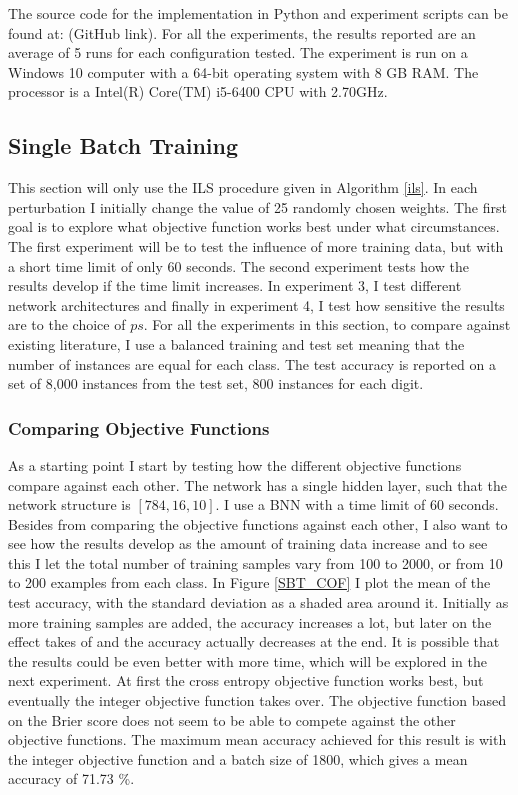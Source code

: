 \noindent The source code for the implementation in Python and experiment scripts can be found at: (GitHub link). For all the experiments, the results reported are an average of 5 runs for each configuration tested. The experiment is run on a Windows 10 computer with a 64-bit operating system with 8 GB RAM. The processor is a Intel(R) Core(TM) i5-6400 CPU with 2.70GHz. 


\subsection{Single Batch Training}

This section will only use the ILS procedure given in Algorithm \ref{ils}. In each perturbation I initially change the value of 25 randomly chosen weights. The first goal is to explore what objective function works best under what circumstances. The first experiment will be to test the influence of more training data, but with a short time limit of only 60 seconds. The second experiment tests how the results develop if the time limit increases. In experiment 3, I test different network architectures and finally in experiment 4, I test how sensitive the results are to the choice of $ps$. For all the experiments in this section, to compare against existing literature, I use a balanced training and test set meaning that the number of instances are equal for each class. The test accuracy is reported on a set of 8,000 instances from the test set, 800 instances for each digit.

\subsubsection{Comparing Objective Functions}

As a starting point I start by testing how the different objective functions compare against each other. The network has a single hidden layer, such that the network structure is $[784, 16, 10]$. I use a BNN with a time limit of 60 seconds. Besides from comparing the objective functions against each other, I also want to see how the results develop as the amount of training data increase and to see this I let the total number of training samples vary from 100 to 2000, or from 10 to 200 examples from each class. In Figure \ref{SBT_COF} I plot the mean of the test accuracy, with the standard deviation as a shaded area around it. Initially as more training samples are added, the accuracy increases a lot, but later on the effect takes of and the accuracy actually decreases at the end. It is possible that the results could be even better with more time, which will be explored in the next experiment. At first the cross entropy objective function works best, but eventually the integer objective function takes over. The objective function based on the Brier score does not seem to be able to compete against the other objective functions. The maximum mean accuracy achieved for this result is with the integer objective function and a batch size of 1800, which gives a mean accuracy of 71.73 \%. \\

